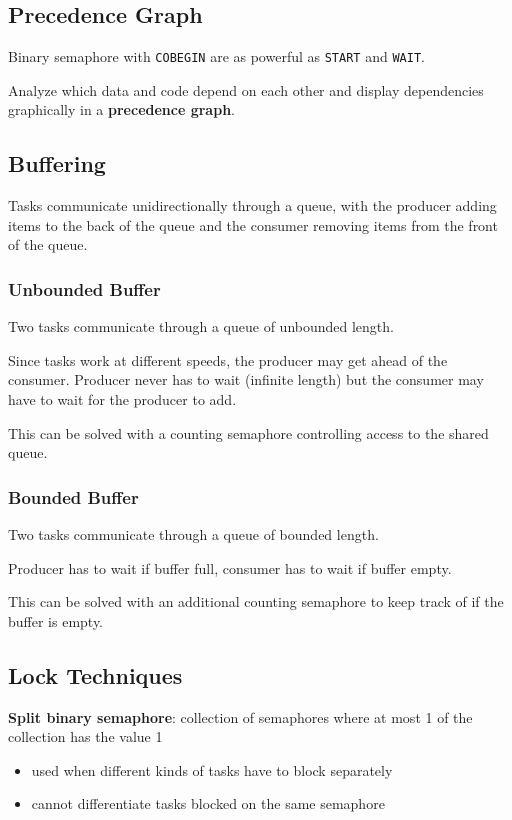 \documentclass[11pt]{article}
\begin{document}
\subsection{Precedence Graph}
\label{sec:org5d41130}
Binary semaphore with \texttt{COBEGIN} are as powerful as \texttt{START} and \texttt{WAIT}.

Analyze which data and code depend on each other and display dependencies graphically
in a \textbf{precedence graph}.
\subsection{Buffering}
\label{sec:org0aa3d26}
Tasks communicate unidirectionally through a queue, with the producer adding items to the back
of the queue and the consumer removing items from the front of the queue.
\subsubsection{Unbounded Buffer}
\label{sec:org2faaa51}
Two tasks communicate through a queue of unbounded length.

Since tasks work at different speeds, the producer may get ahead of the consumer.
Producer never has to wait (infinite length) but the consumer may have to wait for the producer to add.

This can be solved with a counting semaphore controlling access to the shared queue.
\subsubsection{Bounded Buffer}
\label{sec:orgedc13c4}
Two tasks communicate through a queue of bounded length.

Producer has to wait if buffer full, consumer has to wait if buffer empty.

This can be solved with an additional counting semaphore to keep track of if the buffer is empty.
\subsection{Lock Techniques}
\label{sec:org02e1dbe}
\textbf{Split binary semaphore}: collection of semaphores where at most 1 of the collection has the value 1
\begin{itemize}
\item used when different kinds of tasks have to block separately
\item cannot differentiate tasks blocked on the same semaphore
\end{itemize}
\end{document}
